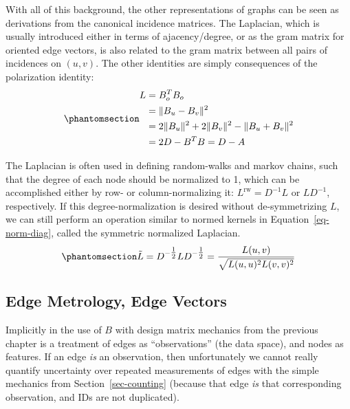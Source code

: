 \documentclass[%
	12pt,
		oneside,
		letterpaper
]{book}
\begin{document}
With all of this background, the other representations of graphs can be
seen as derivations from the canonical incidence matrices. The
Laplacian, which is usually introduced either in terms of
ajacency/degree, or as the gram matrix for oriented edge vectors, is
also related to the gram matrix between all pairs of incidences on
\((u,v)\). The other identities are simply consequences of the
polarization identity:
\begin{equation}\phantomsection\label{eq-laplacian}{
\begin{split}
L & = B_o^TB_o\\
  & = \|B_u - B_v \|^2 \\
  & = 2\|B_u\|^2 +2\|B_v\|^2 - \|B_u + B_v \|^2 \\
  & = 2D - B^TB = D-A
\end{split}
}\end{equation}

The Laplacian is often used in defining random-walks and markov chains,
such that the degree of each node should be normalized to 1, which can
be accomplished either by row- or column-normalizing it:
\(L^{\textrm{rw}}=D^{-1}L\) or \(LD^{-1}\), respectively. If this
degree-normalization is desired without de-symmetrizing \(L\), we can
still perform an operation similar to normed kernels in
Equation~\ref{eq-norm-diag}, called the symmetric normalized Laplacian.
\begin{equation}\phantomsection\label{eq-norm-laplacian}{
\tilde{L} = D^{-\tfrac{1}{2}}LD^{-\tfrac{1}{2}} = \frac{L(u,v)}{\sqrt{L(u,u)^2L(v,v)^2}}
}\end{equation}

\subsection{Edge Metrology, Edge
Vectors}\label{edge-metrology-edge-vectors}

Implicitly in the use of \(B\) with design matrix mechanics from the
previous chapter is a treatment of edges as ``observations'' (the data
space), and nodes as features. If an edge \emph{is} an observation, then
unfortunately we cannot really quantify uncertainty over repeated
measurements of edges with the simple mechanics from
Section~\ref{sec-counting} (because that edge \emph{is} that
corresponding observation, and IDs are not duplicated).
\end{document}
